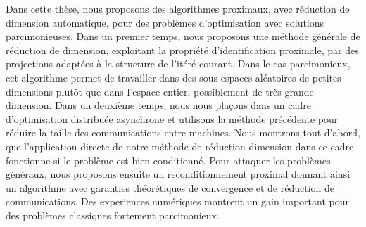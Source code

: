 Dans cette th\`ese, nous proposons des algorithmes proximaux, avec réduction de dimension automatique, pour des probl\`emes d’optimisation avec solutions parcimonieuses. Dans un premier temps, nous proposons une méthode générale de r\'eduction de dimension, exploitant la propri\'et\'e d’identification proximale, par des projections adaptées à la structure de l’it\'er\'e courant. Dans le cas parcimonieux, cet algorithme permet de travailler dans des sous-espaces al\'eatoires de petites dimensions plut\^ot que dans l’espace entier, possiblement de tr\`es grande dimension. Dans un deuxi\`eme temps, nous nous pla\c cons dans un cadre d’optimisation distribu\'ee asynchrone et utilisons la méthode pr\'ec\'edente pour réduire la taille des communications entre machines. Nous montrons tout d’abord, que l’application directe de notre m\'ethode de r\'eduction dimension dans ce cadre fonctionne si le probl\`eme est bien conditionn\'e. Pour attaquer les probl\`emes g\'en\'eraux, nous proposons ensuite un reconditionnement proximal donnant ainsi un algorithme avec garanties th\'eor\'etiques de convergence et de r\'eduction de communications. Des experiences num\'eriques montrent un gain important pour des probl\`emes classiques fortement parcimonieux.